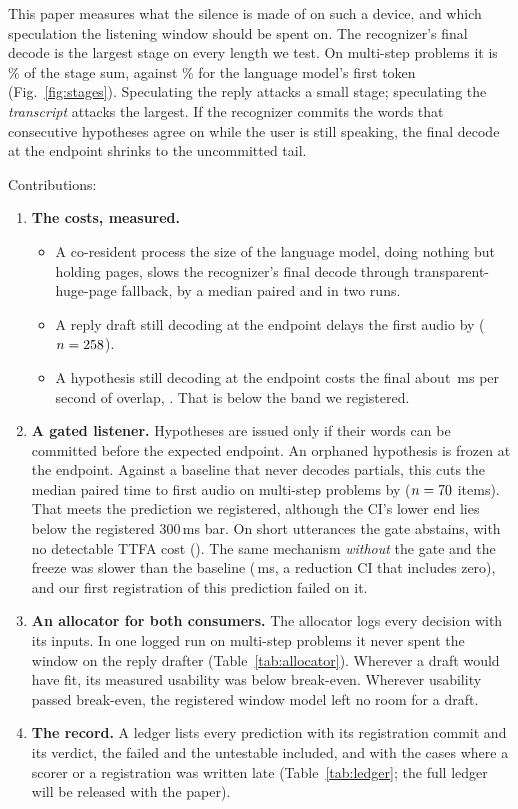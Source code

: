\documentclass[a4paper,10pt,twocolumn]{article}
\newif\ifextended
\newcommand{\fullledgerwhere}{will be released with the paper}
\newcommand{\fullledgerwhere}{is in the extended version}
\begin{document}
This paper measures what the silence is made of on such a device, and which
speculation the listening window should be spent on. The recognizer's final
decode is the largest stage on every length we test. On multi-step problems it
is \SttShareMulti\% of the stage sum, against \LlmShareMulti\% for the language
model's first token (Fig.~\ref{fig:stages}). Speculating the reply attacks a
small stage; speculating the \emph{transcript} attacks the largest. If the
recognizer commits the words that consecutive hypotheses agree on while the
user is still speaking, the final decode at the endpoint shrinks to the
uncommitted tail.

Contributions:
\begin{enumerate}
\item \textbf{The costs, measured.}
  \begin{itemize}
  \item A co-resident process the size of the language model, doing nothing
    but holding pages, slows the recognizer's final decode through
    transparent-huge-page fallback, by a median paired \TaxBallastA{} and
    \TaxBallastB{} in two runs.
  \item A reply draft still decoding at the endpoint delays the first audio by
    \ThinkerOverlap{} ($n=258$).
  \item A hypothesis still decoding at the endpoint costs the final about
    \ListenerC\,ms per second of overlap, \ListenerCCI. That is below the band
    we registered.
  \end{itemize}
\item \textbf{A gated listener.} Hypotheses are issued only if their words can
  be committed before the expected endpoint. An orphaned hypothesis is frozen
  at the endpoint. Against a baseline that never decodes partials, this cuts
  the median paired time to first audio on multi-step problems by \PthreeRed{}
  ($n=70$ items). That meets the prediction we registered, although the
  CI's lower end lies below the registered 300\,ms bar. On short utterances the
  gate abstains, with no detectable TTFA cost (\DevTTFA). The same mechanism
  \emph{without} the gate and the freeze was slower than the baseline
  (\PtwoTTFA\,ms, a reduction CI that includes zero), and our first
  registration of this prediction failed on it.
\item \textbf{An allocator for both consumers.} The allocator logs every
  decision with its inputs. In one logged run on multi-step problems it never
  spent the window on the reply drafter (Table~\ref{tab:allocator}). Wherever a
  draft would have fit, its measured usability was below break-even. Wherever
  usability passed break-even, the registered window model left no room for a
  draft.
\item \textbf{The record.} A ledger lists every prediction with its
  registration commit and its verdict, the failed and the untestable included,
  and with the cases where a scorer or a registration was written late
  (Table~\ref{tab:ledger}\ifextended\else; the full ledger \fullledgerwhere\fi).
\end{enumerate}
\end{document}
